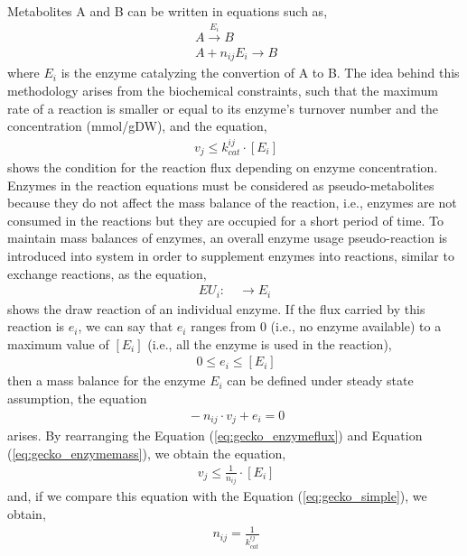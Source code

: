 Metabolites A and B can be written in equations such as,
\begin{align}
\label{eq:geckoreaction}
 \ A \xrightarrow{E_i} B \\
 \label{eq:gecko}
 \ A + n_{ij}E_i \xrightarrow{} B
\end{align}
\noindent where $E_i$ is the enzyme catalyzing the convertion of A to B. The idea behind this methodology arises from the biochemical constraints, such that the maximum rate of a reaction is smaller or equal to its enzyme's turnover number and the concentration (mmol/gDW), and the equation,
\begin{align}
 \label{eq:gecko_simple}
 \ v_{j} \leq k_{cat}^{ij} \cdot [E_{i}]
\end{align}
\noindent shows the condition for the reaction flux depending on enzyme concentration. Enzymes in the reaction equations must be considered as pseudo-metabolites because they do not affect the mass balance of the reaction, i.e., enzymes are not consumed in the reactions but they are occupied for a short period of time. To maintain mass balances of enzymes, an overall enzyme usage pseudo-reaction is introduced into system in order to supplement enzymes into reactions, similar to exchange reactions, as the equation,
\begin{align}
 \label{eq:gecko_suppelement}
 \  EU_i: \quad \to E_i
 \
\end{align}
\noindent shows the draw reaction of an individual enzyme. If the flux carried by this reaction is $e_i$, we can say that $e_i$ ranges from 0 (i.e., no enzyme available) to a maximum value of $[E_i]$ (i.e., all the enzyme is used in the reaction),
\begin{align}
 \label{eq:gecko_enzymeflux}
 \  0 \leq e_i \leq [E_i]
\end{align}
then a mass balance for the enzyme $E_i$ can be defined under steady state assumption, the equation
\begin{align}
 \label{eq:gecko_enzymemass}
 \  -n_{ij} \cdot v_j + e_i = 0
\end{align}
arises. By rearranging the Equation (\ref{eq:gecko_enzymeflux}) and Equation (\ref{eq:gecko_enzymemass}), we obtain the equation,
\begin{align}
 \label{eq:gecko_enzymemassrearranged}
 \ v_j \leq \frac{1}{n_{ij}} \cdot [E_i]
\end{align}
and, if we compare this equation with the Equation (\ref{eq:gecko_simple}), we obtain,
\begin{align}
 \label{eq:gecko_enzymestoichiometry}
 \ n_{ij}=\frac{1}{k_{cat}^{ij}}
\end{align}
